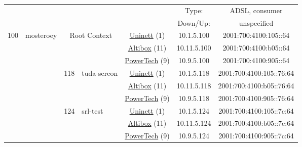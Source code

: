 \begin{small}
\begin{center}
\begin{longtable}{|c|c|c|c|c|c|c|c|}
  & \multicolumn{3}{|c|}{} & \multicolumn{2}{|c|}{} & Type: & ADSL, consumer \\* \cline{7-7}\cline{8-8}
  & \multicolumn{3}{|c|}{} & \multicolumn{2}{|c|}{} & Down/Up:  & unspecified \\ \hline
 \multirow{45}{*}{\tiny{100}} & \multicolumn{1}{|l|}{\multirow{45}{*}{\tiny{mosteroey}}} & \multicolumn{2}{|c|}{\multirow{3}{*}{\tiny{Root Context}}} & \multicolumn{2}{|c|}{\tiny{\href{https://www.uninett.no}{Uninett} (1)}} & \tiny{10.1.5.100} & \tiny{2001:700:4100:105::64} \\* \cline{5-5}\cline{6-6}\cline{7-7}\cline{8-8}
  &  & \multicolumn{2}{|c|}{} & \multicolumn{2}{|c|}{\tiny{\href{https://www.altibox.no}{Altibox} (11)}} & \tiny{10.11.5.100} & \tiny{2001:700:4100:b05::64} \\* \cline{5-5}\cline{6-6}\cline{7-7}\cline{8-8}
  &  & \multicolumn{2}{|c|}{} & \multicolumn{2}{|c|}{\tiny{\href{http://www.powertech.no}{PowerTech} (9)}} & \tiny{10.9.5.100} & \tiny{2001:700:4100:905::64} \\* \cline{3-3}\cline{4-4}\cline{5-5}\cline{6-6}\cline{7-7}\cline{8-8}
  &  & \multirow{3}{*}{\tiny{118}} & \multicolumn{1}{|l|}{\multirow{3}{*}{\tiny{tuda-sereon}}} & \multicolumn{2}{|c|}{\tiny{\href{https://www.uninett.no}{Uninett} (1)}} & \tiny{10.1.5.118} & \tiny{2001:700:4100:105::76:64} \\* \cline{5-5}\cline{6-6}\cline{7-7}\cline{8-8}
  &  &  &  & \multicolumn{2}{|c|}{\tiny{\href{https://www.altibox.no}{Altibox} (11)}} & \tiny{10.11.5.118} & \tiny{2001:700:4100:b05::76:64} \\* \cline{5-5}\cline{6-6}\cline{7-7}\cline{8-8}
  &  &  &  & \multicolumn{2}{|c|}{\tiny{\href{http://www.powertech.no}{PowerTech} (9)}} & \tiny{10.9.5.118} & \tiny{2001:700:4100:905::76:64} \\* \cline{3-3}\cline{4-4}\cline{5-5}\cline{6-6}\cline{7-7}\cline{8-8}
  &  & \multirow{3}{*}{\tiny{124}} & \multicolumn{1}{|l|}{\multirow{3}{*}{\tiny{srl-test}}} & \multicolumn{2}{|c|}{\tiny{\href{https://www.uninett.no}{Uninett} (1)}} & \tiny{10.1.5.124} & \tiny{2001:700:4100:105::7c:64} \\* \cline{5-5}\cline{6-6}\cline{7-7}\cline{8-8}
  &  &  &  & \multicolumn{2}{|c|}{\tiny{\href{https://www.altibox.no}{Altibox} (11)}} & \tiny{10.11.5.124} & \tiny{2001:700:4100:b05::7c:64} \\* \cline{5-5}\cline{6-6}\cline{7-7}\cline{8-8}
  &  &  &  & \multicolumn{2}{|c|}{\tiny{\href{http://www.powertech.no}{PowerTech} (9)}} & \tiny{10.9.5.124} & \tiny{2001:700:4100:905::7c:64} \\* \cline{3-3}\cline{4-4}\cline{5-5}\cline{6-6}\cline{7-7}\cline{8-8}

\end{longtable}
\end{center}
\end{small}
